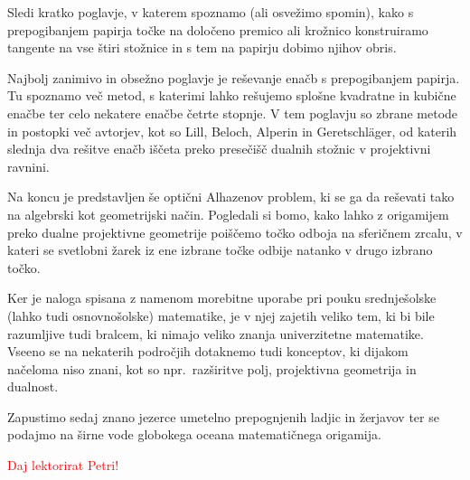 Sledi kratko poglavje, v katerem spoznamo (ali osvežimo spomin), kako s prepogibanjem papirja točke na določeno premico ali krožnico konstruiramo tangente na vse štiri stožnice in s tem na papirju dobimo njihov obris.

Najbolj zanimivo in obsežno poglavje je reševanje enačb s prepogibanjem papirja. Tu spoznamo več metod, s katerimi lahko rešujemo splošne kvadratne in kubične enačbe ter celo nekatere enačbe četrte stopnje. V tem poglavju so zbrane metode in postopki več avtorjev, kot so Lill, Beloch, Alperin in Geretschläger, od katerih slednja dva rešitve enačb iščeta preko presečišč dualnih stožnic v projektivni ravnini.

Na koncu je predstavljen še optični Alhazenov problem, ki se ga da reševati tako na algebrski kot geometrijski način. Pogledali si bomo, kako lahko z origamijem preko dualne projektivne geometrije poiščemo točko odboja na sferičnem zrcalu, v kateri se svetlobni žarek iz ene izbrane točke odbije natanko v drugo izbrano točko.

Ker je naloga spisana z namenom morebitne uporabe pri pouku srednješolske (lahko tudi osnovnošolske) matematike, je v njej zajetih veliko tem, ki bi bile razumljive tudi bralcem, ki nimajo veliko znanja univerzitetne matematike. Vseeno se na nekaterih področjih dotaknemo tudi konceptov, ki dijakom načeloma niso znani, kot so npr.\ razširitve polj, projektivna geometrija in dualnost.

Zapustimo sedaj znano jezerce umetelno prepognjenih ladjic in žerjavov ter se podajmo na širne vode globokega oceana matematičnega origamija.

\textcolor{red}{Daj lektorirat Petri!}